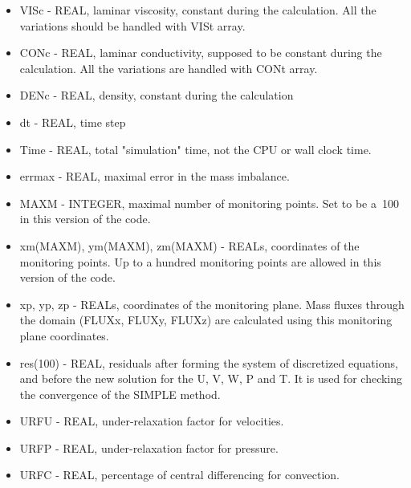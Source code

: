 \documentclass[10pt]{article}
\newcommand*{\tc}{\ttfamily} %
\begin{document}
\begin{itemize}
    \item
    {\tc VISc} - REAL, laminar viscosity, constant during the calculation.
     All the variations should be handled with {\tc VISt} array. 

    \item
    {\tc CONc} - REAL, laminar conductivity, supposed to be constant during
     the calculation. All the variations are handled with {\tc CONt} array.

    \item
    {\tc DENc} - REAL, density, constant during the calculation
   
    \item
    {\tc dt} - REAL, time step

    \item
    {\tc Time} - REAL, total "simulation" time, not the CPU or wall clock 
      time.

    \item
    {\tc errmax} - REAL, maximal error in the mass imbalance.

    \item  
    {\tc MAXM} - INTEGER, maximal number of monitoring points. Set to be a~100
      in this version of the code.

    \item
    {\tc xm(MAXM), ym(MAXM), zm(MAXM)} - REALs, coordinates of the monitoring 
      points. Up to a hundred monitoring points are allowed in this version of 
      the code.

    \item
    {\tc xp, yp, zp} - REALs, coordinates of the monitoring plane.
      Mass fluxes through the domain (FLUXx, FLUXy, FLUXz)
      are calculated using this monitoring plane coordinates.

    \item
    {\tc res(100)} - REAL, residuals after forming the system of discretized
      equations, and before the new solution for the {\tc U}, {\tc V}, 
      {\tc W}, {\tc P} and {\tc T}.
      It is used for checking the convergence of the SIMPLE method.
    
    \item
    {\tc URFU} - REAL, under-relaxation factor for velocities.

    \item
    {\tc URFP} - REAL, under-relaxation factor for pressure.

    \item
    {\tc URFC} - REAL, percentage of central differencing for convection.


\end{itemize}
\end{document}
